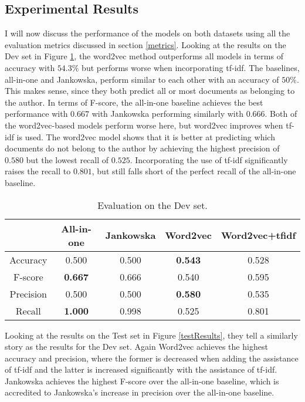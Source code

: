 \documentclass[11pt]{article}
\begin{document}
\subsection{Experimental Results}

I will now discuss the performance of the models on both datasets using all the evaluation metrics discussed in section \ref{metrics}. Looking at the results on the Dev set in Figure \ref{devResults}, the word2vec method outperforms all models in terms of accuracy with $54.3\%$ but performs worse when incorporating tf-idf. The baselines, all-in-one and Jankowska, perform similar to each other with an accuracy of $50\%$. This makes sense, since they both predict all or most documents as belonging to the author. In terms of F-score, the all-in-one baseline achieves the best performance with $0.667$ with Jankowska performing similarly with $0.666$. Both of the word2vec-based models perform worse here, but word2vec improves when tf-idf is used. The word2vec model shows that it is better at predicting which documents do not belong to the author by achieving the highest precision of $0.580$ but the lowest recall of $0.525$. Incorporating the use of tf-idf significantly raises the recall to $0.801$, but still falls short of the perfect recall of the all-in-one baseline. 

\begin{table}
\begin{center}
\small
\setlength{\tabcolsep}{2pt}
\begin{tabular}{c|cccc}

&All-in-one & Jankowska & Word2vec & Word2vec+tfidf\\
\hline
Accuracy & 0.500 & 0.500 & \textbf{0.543} & 0.528 \\
F-score & \textbf{0.667} & 0.666 & 0.540 & 0.595 \\
Precision & 0.500 & 0.500 & \textbf{0.580} & 0.535 \\
Recall &  \textbf{1.000} & 0.998 & 0.525 & 0.801\\
\hline


\end{tabular}
\caption{Evaluation on the Dev set. \label{devResults}}
\end{center}
\end{table}

Looking at the results on the Test set in Figure \ref{testResults}, they tell a similarly story as the results for the Dev set. Again Word2vec achieves the highest accuracy and precision, where the former is decreased when adding the assistance of tf-idf and the latter is increased significantly with the assistance of tf-idf. Jankowska achieves the highest F-score over the all-in-one baseline, which is accredited to Jankowska's increase in precision over the all-in-one baseline.
\end{document}
